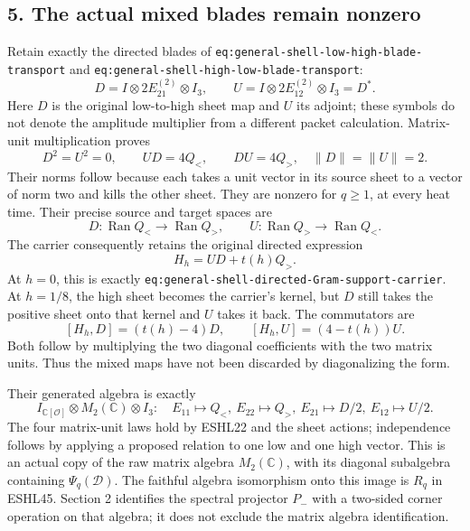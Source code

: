\documentclass[
  10pt,
  a4paper,
]{article}
\begin{document}
\subsection{5. The actual mixed blades remain
nonzero}\label{the-actual-mixed-blades-remain-nonzero}

Retain exactly the directed blades of
\texttt{eq:\allowbreak{}general-\allowbreak{}shell-\allowbreak{}low-\allowbreak{}high-\allowbreak{}blade-\allowbreak{}transport} and
\texttt{eq:\allowbreak{}general-\allowbreak{}shell-\allowbreak{}high-\allowbreak{}low-\allowbreak{}blade-\allowbreak{}transport}: \[
D=I\otimes2E_{21}^{(2)}\otimes I_3,
\qquad U=I\otimes2E_{12}^{(2)}\otimes I_3=D^*.
\tag{ESHL21}
\] Here \(D\) is the original low-to-high sheet map and \(U\) its
adjoint; these symbols do not denote the amplitude multiplier from a
different packet calculation. Matrix-unit multiplication proves \[
D^2=U^2=0,\qquad UD=4Q_<,\qquad DU=4Q_>,
\quad\|D\|=\|U\|=2.
\tag{ESHL22}
\] Their norms follow because each takes a unit vector in its source
sheet to a vector of norm two and kills the other sheet. They are
nonzero for \(q\ge1\), at every heat time. Their precise source and
target spaces are \[
D:\operatorname{Ran}Q_<\to\operatorname{Ran}Q_>,
\qquad U:\operatorname{Ran}Q_>\to\operatorname{Ran}Q_<.
\tag{ESHL23}
\] The carrier consequently retains the original directed expression \[
H_h=UD+t(h)Q_>.
\tag{ESHL24}
\] At \(h=0\), this is exactly
\texttt{eq:\allowbreak{}general-\allowbreak{}shell-\allowbreak{}directed-\allowbreak{}Gram-\allowbreak{}support-\allowbreak{}carrier}. At \(h=1/8\),
the high sheet becomes the carrier's kernel, but \(D\) still takes the
positive sheet onto that kernel and \(U\) takes it back. The commutators
are \[
[H_h,D]=(t(h)-4)D,\qquad [H_h,U]=(4-t(h))U.
\tag{ESHL25}
\] Both follow by multiplying the two diagonal coefficients with the two
matrix units. Thus the mixed maps have not been discarded by
diagonalizing the form.

Their generated algebra is exactly \[
I_{\mathbb C[\mathcal O]}\otimes M_2(\mathbb C)\otimes I_3:
\quad E_{11}\mapsto Q_<,\ E_{22}\mapsto Q_>,
\ E_{21}\mapsto D/2,\ E_{12}\mapsto U/2.
\tag{ESHL26}
\] The four matrix-unit laws hold by ESHL22 and the sheet actions;
independence follows by applying a proposed relation to one low and one
high vector. This is an actual copy of the raw matrix algebra
\(M_2(\mathbb C)\), with its diagonal subalgebra containing
\(\Psi_q(\mathcal D)\). The faithful algebra isomorphism onto this image
is \(R_q\) in ESHL45. Section 2 identifies the spectral projector
\(P_-\) with a two-sided corner operation on that algebra; it does not
exclude the matrix algebra identification.
\end{document}
